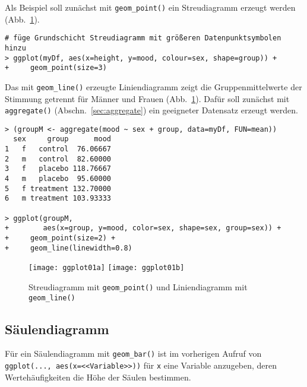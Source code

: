 Als Beispiel soll zunächst mit \lstinline!geom_point()! ein Streudiagramm erzeugt werden (Abb.\ \ref{fig:ggplot01}).
\begin{lstlisting}
# füge Grundschicht Streudiagramm mit größeren Datenpunktsymbolen hinzu
> ggplot(myDf, aes(x=height, y=mood, colour=sex, shape=group)) +
+     geom_point(size=3)
\end{lstlisting}

Das mit \lstinline!geom_line()! erzeugte Liniendiagramm zeigt die Gruppenmittelwerte der Stimmung getrennt für Männer und Frauen (Abb.\ \ref{fig:ggplot01}). Dafür soll zunächst mit \lstinline!aggregate()! (Abschn.\ \ref{sec:aggregate}) ein geeigneter Datensatz erzeugt werden.
\begin{lstlisting}
> (groupM <- aggregate(mood ~ sex + group, data=myDf, FUN=mean))
  sex     group      mood
1   f   control  76.06667
2   m   control  82.60000
3   f   placebo 118.76667
4   m   placebo  95.60000
5   f treatment 132.70000
6   m treatment 103.93333

> ggplot(groupM,
+        aes(x=group, y=mood, color=sex, shape=sex, group=sex)) +
+     geom_point(size=2) +
+     geom_line(linewidth=0.8)
\end{lstlisting}

\begin{figure}[ht]
\centering
\texttt{[image: ggplot01a]}
\texttt{[image: ggplot01b]}
\vspace*{-0.5em}
\caption{Streudiagramm mit \lstinline!geom_point()! und Liniendiagramm mit \lstinline!geom_line()!}
\label{fig:ggplot01}
\end{figure}

\subsection{Säulendiagramm}
\label{sec:ggplotBar}

Für ein Säulendiagramm mit \lstinline!geom_bar()! ist im vorherigen Aufruf von \lstinline!ggplot(..., aes(x=<<Variable>>))! für \lstinline!x! eine Variable anzugeben, deren Wertehäufigkeiten die Höhe der Säulen bestimmen.

